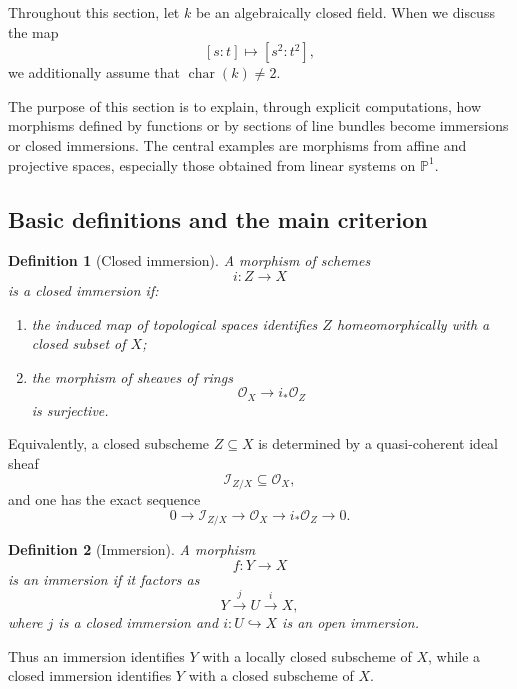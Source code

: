 \documentclass[12pt,a4paper]{article}
\theoremstyle{notespace}
\newtheorem{definition}{Definition}[subsection]
\begin{document}
Throughout this section, let \(k\) be an algebraically closed field. When we discuss the map
\[
[s:t]\longmapsto [s^{2}:t^{2}],
\]
we additionally assume that \(\operatorname{char}(k)\neq 2\).

The purpose of this section is to explain, through explicit computations, how morphisms defined by functions or by sections of line bundles become immersions or closed immersions. The central examples are morphisms from affine and projective spaces, especially those obtained from linear systems on \(\mathbb{P}^{1}\).

\subsection{Basic definitions and the main criterion}

\begin{definition}[Closed immersion]
	A morphism of schemes
	\[
	i:Z\longrightarrow X
	\]
	is a \emph{closed immersion} if:
	\begin{enumerate}[label=\textup{(\roman*)}]
		\item the induced map of topological spaces identifies \(Z\) homeomorphically with a closed subset of \(X\);
		\item the morphism of sheaves of rings
		\[
		\mathcal{O}_{X}\longrightarrow i_{*}\mathcal{O}_{Z}
		\]
		is surjective.
	\end{enumerate}
\end{definition}

Equivalently, a closed subscheme \(Z\subseteq X\) is determined by a quasi-coherent ideal sheaf
\[
\mathcal{I}_{Z/X}\subseteq \mathcal{O}_{X},
\]
and one has the exact sequence
\[
0\longrightarrow \mathcal{I}_{Z/X}
\longrightarrow \mathcal{O}_{X}
\longrightarrow i_{*}\mathcal{O}_{Z}
\longrightarrow 0.
\]

\begin{definition}[Immersion]
	A morphism
	\[
	f:Y\longrightarrow X
	\]
	is an \emph{immersion} if it factors as
	\[
	Y\xrightarrow{\,j\,}U\xrightarrow{\,i\,}X,
	\]
	where \(j\) is a closed immersion and \(i:U\hookrightarrow X\) is an open immersion.
\end{definition}

Thus an immersion identifies \(Y\) with a locally closed subscheme of \(X\), while a closed immersion identifies \(Y\) with a closed subscheme of \(X\).
\end{document}
